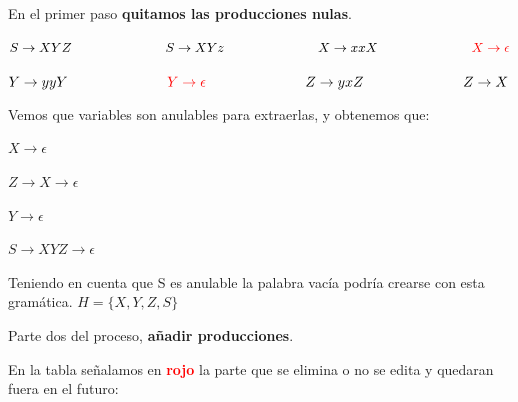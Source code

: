 En el primer paso \textbf{quitamos las producciones nulas}. \newline

$ S \rightarrow XYZ \hspace{2.5cm} S \rightarrow XYz \hspace{2.5cm} X \rightarrow  xxX \hspace{2.5cm} \textcolor{red}{ X \rightarrow  \epsilon } $ \newline

$ Y \rightarrow yyY \hspace{2.5cm} \textcolor{red}{ Y \rightarrow  \epsilon } \hspace{2.5cm} Z \rightarrow  yxZ \hspace{2.5cm} Z \rightarrow  X $ \newline

Vemos que variables son anulables para extraerlas, y obtenemos que: \newline

$ X \rightarrow \epsilon  $

$ Z \rightarrow X \rightarrow \epsilon $

$ Y \rightarrow \epsilon $

$ S \rightarrow XYZ \rightarrow \epsilon $ \newline

Teniendo en cuenta que S es anulable la palabra vacía podría crearse con esta gramática. $ H=\{X,Y,Z,S\} $ \newline

Parte dos del proceso, \textbf{añadir producciones}. \newline

En la tabla señalamos en \textbf{\textcolor{red}{rojo}} la parte que se elimina o no se edita y quedaran fuera en el futuro: 

